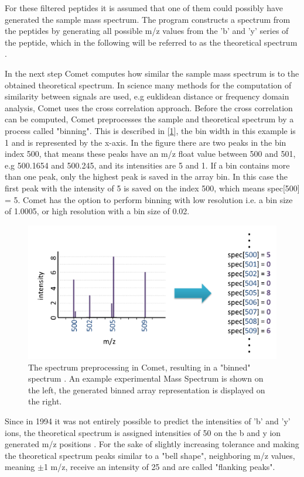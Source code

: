 \documentclass[11pt]{article}
\begin{document}
For these filtered peptides it is assumed that one of them could possibly have generated the sample mass spectrum. The program constructs a spectrum from the peptides by generating all possible m/z values from the 'b' and 'y' series of the peptide, which in the following will be referred to as the theoretical spectrum \cite{comet-first-paper}. 

In the next step Comet computes how similar the sample mass spectrum is to the obtained theoretical spectrum. In science many methods for the computation of similarity between signals are used, e.g euklidean distance or frequency domain analysis, Comet uses the cross correlation approach. Before the cross correlation can be computed, Comet preprocesses the sample and theoretical spectrum by a process called "binning". This is described in [\cref{fig:binning}], the bin width in this example is 1 and is represented by the x-axis. In the figure there are two peaks in the bin index 500, that means these peaks have an m/z float value between 500 and 501, e.g 500.1654 and 500.245, and its intensities are 5 and 1. If a bin contains more than one peak, only the highest peak is saved in the array bin. In this case the first peak with the intensity of 5 is saved on the index 500, which means spec[500] = 5. Comet has the option to perform binning with low resolution i.e. a bin size of 1.0005, or high resolution with a bin size of 0.02. 
\begin{figure}[ht]
\centering
\includegraphics[width=1\textwidth]{figs/binning.png}
\caption{The spectrum preprocessing in Comet, resulting in a "binned" spectrum \cite{deeper-look-into-comet}. An example experimental Mass Spectrum is shown on the left, the generated binned array representation is displayed on the right.}
\label{fig:binning}
\end{figure}
Since in 1994 it was not entirely possible to predict the intensities of 'b' and 'y' ions, the theoretical spectrum is assigned intensities of 50 on the b and y ion generated m/z positions \cite{deeper-look-into-comet}. For the sake of slightly increasing tolerance and making the theoretical spectrum peaks similar to a "bell shape", neighboring m/z values, meaning $\pm$1 m/z, receive an intensity of 25 and are called "flanking peaks". 
\end{document}
